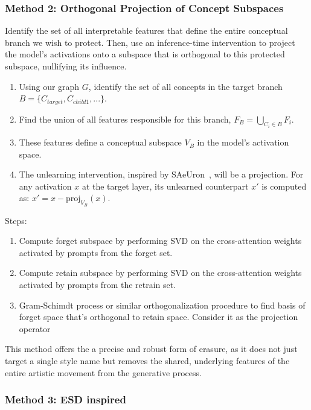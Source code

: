 \subsubsection{Method 2: Orthogonal Projection of Concept Subspaces}
Identify the set of all interpretable features that define the entire conceptual branch we wish to protect. Then, use an inference-time intervention to project the model's activations onto a subspace that is orthogonal to this protected subspace, nullifying its influence.
\begin{enumerate}
\renewcommand{\labelenumi}{(\alph{enumi})}
    \item Using our graph $G$, identify the set of all concepts in the target branch $B = \{C_{target}, C_{child1},...\}$.
    \item Find the union of all features responsible for this branch, $F_B = \bigcup_{C_i \in B} F_i$.
    \item These features define a conceptual subspace $V_B$ in the model's activation space.
    \item The unlearning intervention, inspired by SAeUron~\cite{cywinski2025saeuron}, will be a projection. For any activation $x$ at the target layer, its unlearned counterpart $x'$ is computed as: $x' = x - \text{proj}_{V_B}(x)$.
\end{enumerate}

Steps:
\begin{enumerate}
    \item Compute forget subspace by performing SVD on the cross-attention weights activated by prompts from the forget set.
    \item Compute retain subspace by performing SVD on the cross-attention weights activated by prompts from the retrain set.
    \item Gram-Schimdt process or similar orthogonalization procedure to find basis of forget space that's orthogonal to retain space. Consider it as the projection operator
\end{enumerate}
This method offers the a precise and robust form of erasure, as it does not just target a single style name but removes the shared, underlying features of the entire artistic movement from the generative process.
\subsubsection{Method 3: ESD inspired }
